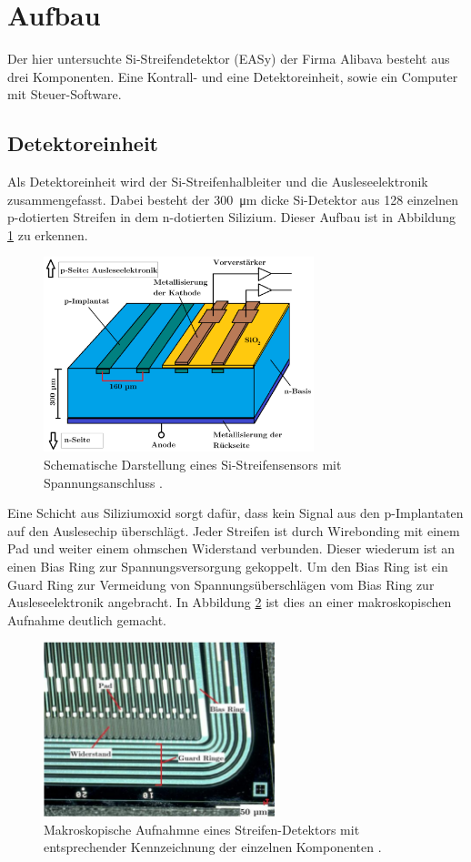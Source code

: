 \newpage
\section{Aufbau}
\label{sec:Aufbau}
Der hier untersuchte Si-Streifendetektor (EASy) der Firma Alibava besteht aus drei Komponenten. Eine Kontrall- und eine Detektoreinheit, sowie ein Computer mit Steuer-Software.

\subsection{Detektoreinheit}
\label{sec:Detektoreinheit}
 Als Detektoreinheit wird der Si-Streifenhalbleiter und die Ausleseelektronik
 zusammengefasst. Dabei besteht der \SI{300}{\micro\meter} dicke Si-Detektor
 aus 128 einzelnen p-dotierten Streifen in dem n-dotierten Silizium.  Dieser
 Aufbau ist in Abbildung \ref{fig:schema} zu erkennen.
 \begin{figure}[htb]
   \centering
   \includegraphics[width=0.7\textwidth]{images/Schema.png}
   \caption{Schematische Darstellung eines Si-Streifensensors mit Spannungsanschluss \cite{anleitung}.}
   \label{fig:schema}
 \end{figure}
 \FloatBarrier
Eine Schicht aus Siliziumoxid sorgt dafür, dass kein Signal aus den p-Implantaten
auf den Auslesechip überschlägt. Jeder Streifen ist durch Wirebonding mit einem Pad und weiter
einem ohmschen Widerstand
verbunden. Dieser wiederum ist an einen Bias Ring zur Spannungsversorgung gekoppelt.
Um den Bias Ring ist ein Guard Ring zur Vermeidung von Spannungsüberschlägen vom Bias
Ring zur Ausleseelektronik angebracht. In Abbildung \ref{fig:streifen} ist dies an
einer makroskopischen Aufnahme deutlich gemacht.
\begin{figure}[htb]
  \centering
  \includegraphics[width=0.6\textwidth]{images/Sensor.png}
  \caption{Makroskopische Aufnahmne eines Streifen-Detektors mit entsprechender Kennzeichnung der einzelnen Komponenten \cite{anleitung}.}
  \label{fig:streifen}
\end{figure}
